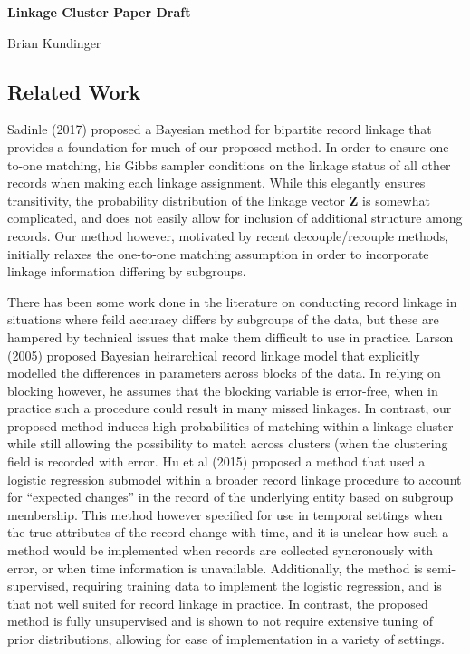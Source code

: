 \documentclass[
  12pt,
]{article}
\author{}
\date{\vspace{-2.5em}}
\begin{document}
\begin{flushright} 
    \end{flushright}
    \begin{center} \textbf{Linkage Cluster Paper Draft}
    
    Brian Kundinger

    \end{center}

\hypertarget{related-work}{%
\subsection{Related Work}\label{related-work}}

Sadinle (2017) proposed a Bayesian method for bipartite record linkage
that provides a foundation for much of our proposed method. In order to
ensure one-to-one matching, his Gibbs sampler conditions on the linkage
status of all other records when making each linkage assignment. While
this elegantly ensures transitivity, the probability distribution of the
linkage vector \(\mathbf{Z}\) is somewhat complicated, and does not
easily allow for inclusion of additional structure among records. Our
method however, motivated by recent decouple/recouple methods, initially
relaxes the one-to-one matching assumption in order to incorporate
linkage information differing by subgroups.

There has been some work done in the literature on conducting record
linkage in situations where feild accuracy differs by subgroups of the
data, but these are hampered by technical issues that make them
difficult to use in practice. Larson (2005) proposed Bayesian
heirarchical record linkage model that explicitly modelled the
differences in parameters across blocks of the data. In relying on
blocking however, he assumes that the blocking variable is error-free,
when in practice such a procedure could result in many missed linkages.
In contrast, our proposed method induces high probabilities of matching
within a linkage cluster while still allowing the possibility to match
across clusters (when the clustering field is recorded with error. Hu et
al (2015) proposed a method that used a logistic regression submodel
within a broader record linkage procedure to account for ``expected
changes'' in the record of the underlying entity based on subgroup
membership. This method however specified for use in temporal settings
when the true attributes of the record change with time, and it is
unclear how such a method would be implemented when records are
collected syncronously with error, or when time information is
unavailable. Additionally, the method is semi-supervised, requiring
training data to implement the logistic regression, and is that not well
suited for record linkage in practice. In contrast, the proposed method
is fully unsupervised and is shown to not require extensive tuning of
prior distributions, allowing for ease of implementation in a variety of
settings.
\end{document}
